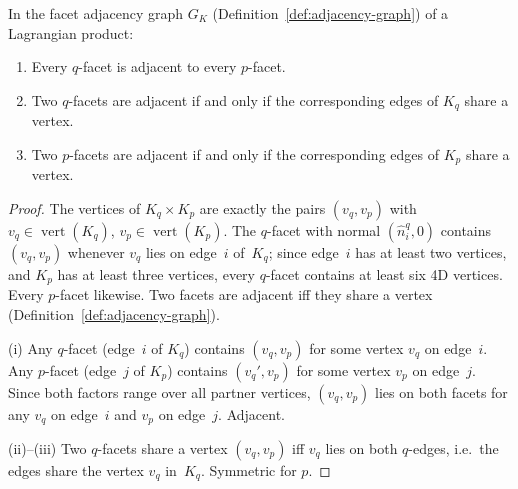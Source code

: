 \begin{lemma}\label{lem:lagrangian-adjacency}
In the facet adjacency graph $G_K$
(Definition~\ref{def:adjacency-graph}) of a Lagrangian product:
\begin{enumerate}
\item Every $q$-facet is adjacent to every $p$-facet.
\item Two $q$-facets are adjacent if and only if
  the corresponding edges of $K_q$ share a vertex.
\item Two $p$-facets are adjacent if and only if
  the corresponding edges of $K_p$ share a vertex.
\end{enumerate}
\end{lemma}

\begin{proof}
The vertices of $K_q \times K_p$ are exactly the pairs
$(v_q, v_p)$ with $v_q \in \operatorname{vert}(K_q)$,
$v_p \in \operatorname{vert}(K_p)$.
The $q$-facet with normal $(\hat{n}_i^q, 0)$ contains
$(v_q, v_p)$ whenever $v_q$ lies on edge~$i$ of~$K_q$;
since edge~$i$ has at least two vertices, and $K_p$ has at
least three vertices, every $q$-facet contains at least six
4D vertices. Every $p$-facet likewise.
Two facets are adjacent iff they share a vertex
(Definition~\ref{def:adjacency-graph}).

(i) Any $q$-facet (edge~$i$ of $K_q$) contains $(v_q, v_p)$
for some vertex $v_q$ on edge~$i$. Any $p$-facet (edge~$j$
of $K_p$) contains $(v_q', v_p)$ for some vertex $v_p$ on
edge~$j$. Since both factors range over all partner vertices,
$(v_q, v_p)$ lies on both facets for any $v_q$ on edge~$i$
and $v_p$ on edge~$j$. Adjacent.

(ii)--(iii) Two $q$-facets share a vertex $(v_q, v_p)$ iff
$v_q$ lies on both $q$-edges, i.e.\ the edges share the
vertex $v_q$ in~$K_q$. Symmetric for $p$.
\end{proof}

